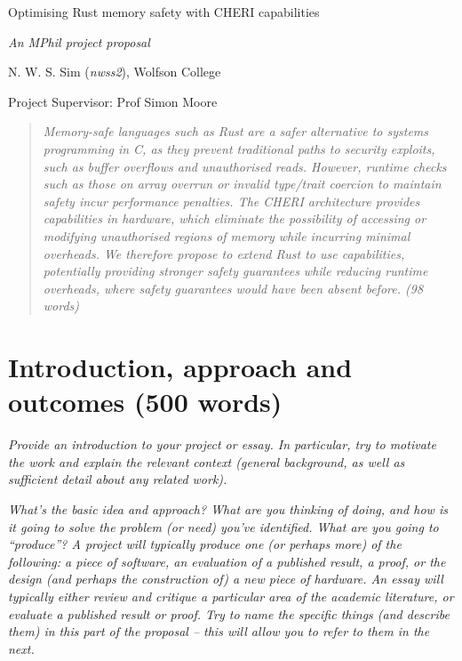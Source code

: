 \documentclass[11pt]{article}
\begin{document}
\centerline{\Large Optimising Rust memory safety with CHERI capabilities}
\vspace{2em}
\centerline{\Large \emph{An MPhil project proposal}}
\vspace{2em}
\centerline{\large N. W. S. Sim (\emph{nwss2}), Wolfson College}
\vspace{1em}
\centerline{\large Project Supervisor: Prof Simon Moore}
\vspace{1em}

\begin{abstract}
\textsl{
Memory-safe languages such as Rust are a safer alternative to systems programming in C, as they prevent traditional paths to security exploits, such as buffer overflows and unauthorised reads.
However, runtime checks such as those on array overrun or invalid type/trait coercion to maintain safety incur performance penalties.
The CHERI architecture provides \emph{capabilities} in hardware, which eliminate the possibility of accessing or modifying unauthorised regions of memory while incurring minimal overheads.
We therefore propose to extend Rust to use capabilities, potentially providing stronger safety guarantees while reducing runtime overheads, where safety guarantees would have been absent before.
(98 words)} 
\end{abstract}

\section{Introduction, approach and outcomes (500 words)}

\textsl{Provide an introduction to your project or essay. In particular, try to
  motivate the work and explain the relevant context (general
  background, as well as sufficient detail about any related
  work).}

\textsl{What's the basic idea and approach? What are you thinking of 
doing, and how is it going to solve the problem (or need) you've 
identified. What are you going to ``produce''? 
A project will typically produce one (or perhaps more) of the following:
a piece of software, an evaluation of a published result, a proof, or
the design (and perhaps the construction of) a new piece of hardware. An
essay will typically either review and critique a particular area of the
academic literature, or evaluate a published result or proof. Try to 
name the specific things (and describe them) in this part of the 
proposal -- this will allow you to refer to them in the next.} 
\end{document}
